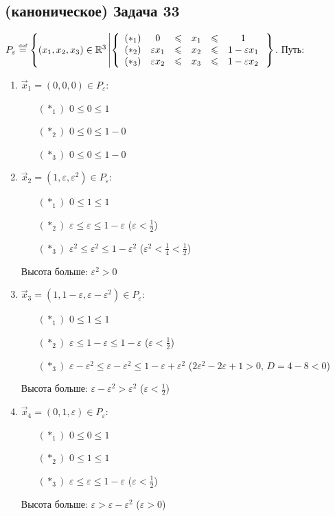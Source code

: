 \documentclass[a4paper]{article}
\def\eps{\varepsilon}
\def\eqdef{\overset{\mbox{\tiny def}}{=}}
\newcommand{\RR}{\mathbb{R}}
\begin{document}
\subsection*{(каноническое) Задача 33}
$P_\eps\eqdef\left\{(x_1,x_2,x_3)\in\RR^3\left| \left\{\begin{array}{lclllc}
(*_1) & 0        & \leqslant & x_1 & \leqslant & 1\\
(*_2) & \eps x_1 & \leqslant & x_2 & \leqslant & 1-\eps x_1\\
(*_3) & \eps x_2 & \leqslant & x_3 & \leqslant & 1-\eps x_2
\end{array}
\right.\right.\right\}$.\newline
Путь:\begin{enumerate}
\item $\vec{x}_1=(0,0,0)\in P_\eps$:\begin{enumerate}
\item[$(*_1)$] $0\leqslant 0\leqslant 1$
\item[$(*_2)$] $0\leqslant 0\leqslant 1-0$
\item[$(*_3)$] $0\leqslant 0\leqslant 1-0$
\end{enumerate}
\item $\vec{x}_2=(1,\eps,\eps^2)\in P_\eps$:\begin{enumerate}
\item[$(*_1)$] $0\leqslant 1\leqslant 1$
\item[$(*_2)$] $\eps\leqslant \eps\leqslant 1-\eps$ ($\eps<\frac{1}{2}$)
\item[$(*_3)$] $\eps^2\leqslant \eps^2\leqslant 1-\eps^2$ ($\eps^2<\frac{1}{4}<\frac{1}{2}$)
\end{enumerate}
Высота больше: $\eps^2>0$

\item $\vec{x}_3=(1,1-\eps,\eps-\eps^2)\in P_\eps$:\begin{enumerate}
\item[$(*_1)$] $0\leqslant 1\leqslant 1$
\item[$(*_2)$] $\eps\leqslant 1-\eps\leqslant 1-\eps$ ($\eps<\frac{1}{2}$)
\item[$(*_3)$] $\eps-\eps^2\leqslant \eps-\eps^2\leqslant 1-\eps+\eps^2$ ($2\eps^2-2\eps+1>0,\,D=4-8<0$)
\end{enumerate}
Высота больше: $\eps-\eps^2>\eps^2$ ($\eps<\frac{1}{2}$)

\item $\vec{x}_4=(0,1,\eps)\in P_\eps$:\begin{enumerate}
\item[$(*_1)$] $0 \leqslant 0 \leqslant 1$
\item[$(*_2)$] $0 \leqslant 1 \leqslant 1$
\item[$(*_3)$] $\eps \leqslant \eps \leqslant 1-\eps$ ($\eps<\frac{1}{2}$)
\end{enumerate}
Высота больше: $\eps>\eps-\eps^2$ ($\eps>0$)


\end{enumerate}
\end{document}
